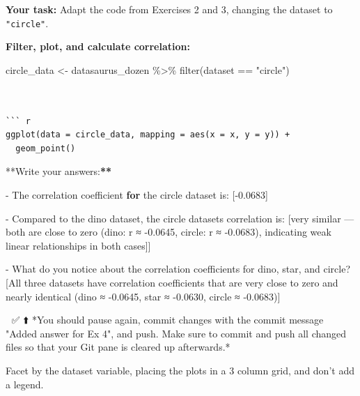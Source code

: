 \documentclass[]{tufte-handout}
\newenvironment{Shaded}{}{}
\newcommand{\ControlFlowTok}[1]{\textcolor[rgb]{0.00,0.44,0.13}{\textbf{#1}}}
\newcommand{\ErrorTok}[1]{\textcolor[rgb]{1.00,0.00,0.00}{\textbf{#1}}}
\newcommand{\FloatTok}[1]{\textcolor[rgb]{0.25,0.63,0.44}{#1}}
\newcommand{\FunctionTok}[1]{\textcolor[rgb]{0.02,0.16,0.49}{#1}}
\newcommand{\NormalTok}[1]{#1}
\newcommand{\OtherTok}[1]{\textcolor[rgb]{0.00,0.44,0.13}{#1}}
\newcommand{\SpecialCharTok}[1]{\textcolor[rgb]{0.25,0.44,0.63}{#1}}
\newcommand{\StringTok}[1]{\textcolor[rgb]{0.25,0.44,0.63}{#1}}
\begin{document}
\textbf{Your task:} Adapt the code from Exercises 2 and 3, changing the
dataset to \texttt{"circle"}.

\textbf{Filter, plot, and calculate correlation:}

\begin{Shaded}
\begin{Highlighting}[]
\NormalTok{circle\_data }\OtherTok{\textless{}{-}}\NormalTok{ datasaurus\_dozen }\SpecialCharTok{\%\textgreater{}\%}
  \FunctionTok{filter}\NormalTok{(dataset }\SpecialCharTok{==} \StringTok{"circle"}\NormalTok{) }
\end{Highlighting}
\end{Shaded}

\begin{verbatim}


``` r
ggplot(data = circle_data, mapping = aes(x = x, y = y)) +
  geom_point()
\end{verbatim}

\begin{Shaded}
\begin{Highlighting}[]
\SpecialCharTok{**}\NormalTok{Write your answers}\SpecialCharTok{:}\ErrorTok{**}

\SpecialCharTok{{-}}\NormalTok{ The correlation coefficient }\ControlFlowTok{for}\NormalTok{ the circle dataset is}\SpecialCharTok{:}\NormalTok{ [}\SpecialCharTok{{-}}\FloatTok{0.0683}\NormalTok{]}

\SpecialCharTok{{-}}\NormalTok{ Compared to the dino dataset, the circle dataset}\StringTok{\textquotesingle{}s correlation is: [very similar — both are close to zero (dino: r ≈ {-}0.0645, circle: r ≈ {-}0.0683), indicating weak linear relationships in both cases]]}

\StringTok{{-} What do you notice about the correlation coefficients for dino, star, and circle? [All three datasets have correlation coefficients that are very close to zero and nearly identical (dino ≈ {-}0.0645, star ≈ {-}0.0630, circle ≈ {-}0.0683)]}

\StringTok{🧶 ✅ ⬆️ *You should pause again, commit changes with the commit message "Added answer for Ex 4", and push. Make sure to commit and push all changed files so that your Git pane is cleared up afterwards.*}
\end{Highlighting}
\end{Shaded}

\begin{marginfigure}
Facet by the dataset variable, placing the plots in a 3 column grid, and
don't add a legend.
\end{marginfigure}
\end{document}
